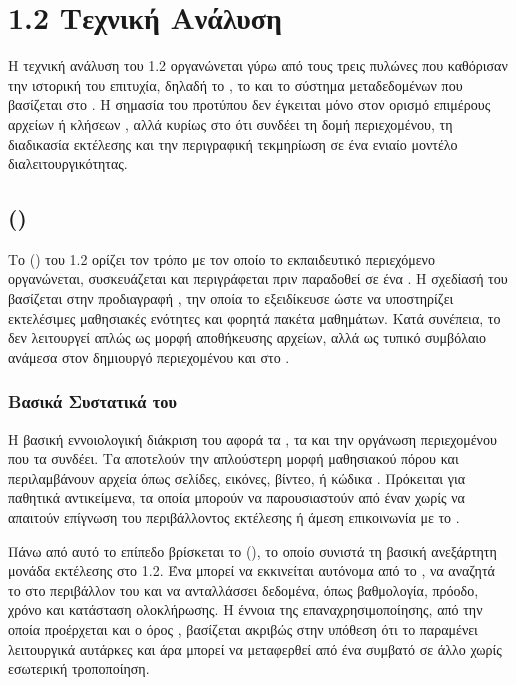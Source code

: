 \section{ 1.2 Τεχνική Ανάλυση}
\label{sec:scorm12_analysis}
\label{sec:scorm12_technical}

Η τεχνική ανάλυση του  1.2 οργανώνεται γύρω από τους τρεις πυλώνες που καθόρισαν την ιστορική του επιτυχία, δηλαδή το   , το   και το σύστημα μεταδεδομένων που βασίζεται στο  . Η σημασία του προτύπου δεν έγκειται μόνο στον ορισμό επιμέρους αρχείων ή κλήσεων , αλλά κυρίως στο ότι συνδέει τη δομή περιεχομένου, τη διαδικασία εκτέλεσης και την περιγραφική τεκμηρίωση σε ένα ενιαίο μοντέλο διαλειτουργικότητας.

\subsection{   ()}
\label{subsec:scorm12_cam}

Το    () του  1.2 ορίζει τον τρόπο με τον οποίο το εκπαιδευτικό περιεχόμενο οργανώνεται, συσκευάζεται και περιγράφεται πριν παραδοθεί σε ένα   . Η σχεδίασή του βασίζεται στην προδιαγραφή   , την οποία το  εξειδίκευσε ώστε να υποστηρίζει εκτελέσιμες μαθησιακές ενότητες και φορητά πακέτα μαθημάτων. Κατά συνέπεια, το  δεν λειτουργεί απλώς ως μορφή αποθήκευσης αρχείων, αλλά ως τυπικό συμβόλαιο ανάμεσα στον δημιουργό περιεχομένου και στο .

\subsubsection{Βασικά Συστατικά του }

Η βασική εννοιολογική διάκριση του  αφορά τα , τα  και την οργάνωση περιεχομένου που τα συνδέει. Τα  αποτελούν την απλούστερη μορφή μαθησιακού πόρου και περιλαμβάνουν αρχεία όπως  σελίδες, εικόνες, βίντεο,  ή κώδικα . Πρόκειται για παθητικά αντικείμενα, τα οποία μπορούν να παρουσιαστούν από έναν  χωρίς να απαιτούν επίγνωση του περιβάλλοντος εκτέλεσης ή άμεση επικοινωνία με το .

Πάνω από αυτό το επίπεδο βρίσκεται το    (), το οποίο συνιστά τη βασική ανεξάρτητη μονάδα εκτέλεσης στο  1.2. Ένα  μπορεί να εκκινείται αυτόνομα από το , να αναζητά το  στο περιβάλλον του  και να ανταλλάσσει δεδομένα, όπως βαθμολογία, πρόοδο, χρόνο και κατάσταση ολοκλήρωσης. Η έννοια της επαναχρησιμοποίησης, από την οποία προέρχεται και ο όρος , βασίζεται ακριβώς στην υπόθεση ότι το  παραμένει λειτουργικά αυτάρκες και άρα μπορεί να μεταφερθεί από ένα συμβατό  σε άλλο χωρίς εσωτερική τροποποίηση.

